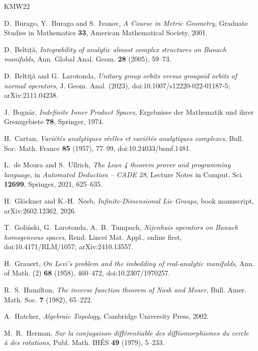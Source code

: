 \begin{thebibliography}{KMW22}

D.~Burago, Y.~Burago and S.~Ivanov, \emph{A Course in Metric Geometry}, Graduate Studies in
Mathematics \textbf{33}, American Mathematical Society, 2001.

D.~Beltiță, \emph{Integrability of analytic almost complex structures on Banach manifolds}, Ann.
Global Anal. Geom. \textbf{28} (2005), 59--73.

D.~Beltiţă and G.~Larotonda, \emph{Unitary group orbits versus groupoid orbits of normal
operators}, J. Geom. Anal. (2023), doi:10.1007/s12220-022-01187-5; arXiv:2111.04238.

J.~Bognár, \emph{Indefinite Inner Product Spaces}, Ergebnisse der Mathematik und ihrer
Grenzgebiete \textbf{78}, Springer, 1974.

H.~Cartan, \emph{Variétés analytiques réelles et variétés analytiques complexes}, Bull. Soc.
Math. France \textbf{85} (1957), 77--99, doi:10.24033/bsmf.1481.

L.~de Moura and S.~Ullrich, \emph{The Lean 4 theorem prover and programming language}, in
\emph{Automated Deduction -- CADE 28}, Lecture Notes in Comput. Sci. \textbf{12699}, Springer,
2021, 625--635.

H.~Glöckner and K.-H.~Neeb, \emph{Infinite-Dimensional Lie Groups}, book manuscript,
arXiv:2602.12362, 2026.

T.~Goliński, G.~Larotonda, A.~B.~Tumpach, \emph{Nijenhuis operators on Banach homogeneous
spaces}, Rend. Lincei Mat. Appl., online first, doi:10.4171/RLM/1057; arXiv:2410.13557.

H.~Grauert, \emph{On Levi's problem and the imbedding of real-analytic manifolds}, Ann. of Math.
(2) \textbf{68} (1958), 460--472, doi:10.2307/1970257.

R.~S.~Hamilton, \emph{The inverse function theorem of Nash and Moser}, Bull. Amer. Math. Soc.
\textbf{7} (1982), 65--222.

A.~Hatcher, \emph{Algebraic Topology}, Cambridge University Press, 2002.

M.~R.~Herman, \emph{Sur la conjugaison différentiable des difféomorphismes du cercle à des
rotations}, Publ. Math. IHÉS \textbf{49} (1979), 5--233.


\end{thebibliography}
